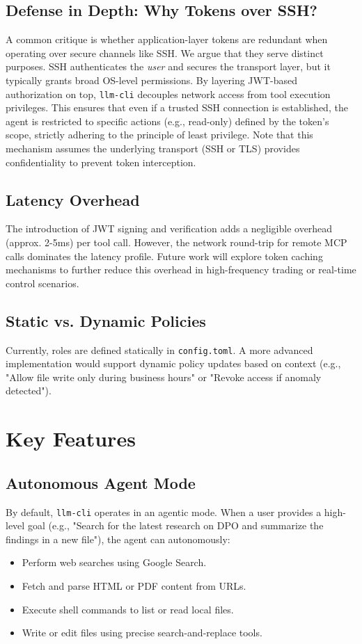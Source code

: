 \documentclass[conference]{IEEEtran}
\begin{document}
\subsection{Defense in Depth: Why Tokens over SSH?}
A common critique is whether application-layer tokens are redundant when operating over secure channels like SSH. We argue that they serve distinct purposes. SSH authenticates the \textit{user} and secures the transport layer, but it typically grants broad OS-level permissions. By layering JWT-based authorization on top, \texttt{llm-cli} decouples network access from tool execution privileges. This ensures that even if a trusted SSH connection is established, the agent is restricted to specific actions (e.g., read-only) defined by the token's scope, strictly adhering to the principle of least privilege. Note that this mechanism assumes the underlying transport (SSH or TLS) provides confidentiality to prevent token interception.

\subsection{Latency Overhead}
The introduction of JWT signing and verification adds a negligible overhead (approx. 2-5ms) per tool call. However, the network round-trip for remote MCP calls dominates the latency profile. Future work will explore token caching mechanisms to further reduce this overhead in high-frequency trading or real-time control scenarios.

\subsection{Static vs. Dynamic Policies}
Currently, roles are defined statically in \texttt{config.toml}. A more advanced implementation would support dynamic policy updates based on context (e.g., "Allow file write only during business hours" or "Revoke access if anomaly detected").

\section{Key Features}

\subsection{Autonomous Agent Mode}
By default, \texttt{llm-cli} operates in an agentic mode. When a user provides a high-level goal (e.g., "Search for the latest research on DPO and summarize the findings in a new file"), the agent can autonomously:
\begin{itemize}
    \item Perform web searches using Google Search.
    \item Fetch and parse HTML or PDF content from URLs.
    \item Execute shell commands to list or read local files.
    \item Write or edit files using precise search-and-replace tools.
\end{itemize}
\end{document}
